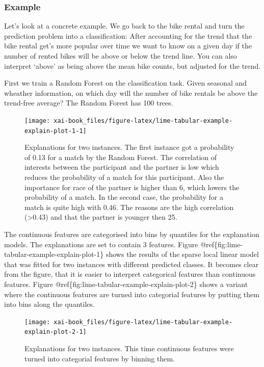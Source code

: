 \documentclass[12pt,]{krantz}
\theoremstyle{definition}
\theoremstyle{definition}
\theoremstyle{definition}
\theoremstyle{remark}
\begin{document}
\subsubsection{Example}\label{example-3}

Let's look at a concrete example. We go back to the bike rental and turn
the prediction problem into a classification: After accounting for the
trend that the bike rental get's more popular over time we want to know
on a given day if the number of rented bikes will be above or below the
trend line. You can also interpret `above' as being above the mean bike
counts, but adjusted for the trend.

First we train a Random Forest on the classification task. Given
seasonal and wheather information, on which day will the number of bike
rentals be above the trend-free average? The Random Forest has 100
trees.

\begin{figure}

{\centering \texttt{[image: xai-book\_files/figure-latex/lime-tabular-example-explain-plot-1-1]} 

}

\caption{Explanations for two instances. The first instance got a probability of 0.13 for a match by the Random Forest. The correlation of interests between the participant and the partner is low which reduces the probability of a match for this participant. Also the importance for race of the partner is higher than 6, which lowers the probability of a match.  In the second case, the probability for a match is quite high with 0.46. The reasons are the high correlation (>0.43) and that the partner is younger then 25.}\label{fig:lime-tabular-example-explain-plot-1}
\end{figure}

The continuous features are categorised into bins by quantiles for the
explanation models. The explanations are set to contain 3 features.
Figure @ref\{fig:lime-tabular-example-explain-plot-1\} shows the results
of the sparse local linear model that was fitted for two instances with
different predicted classes. It becomes clear from the figure, that it
is easier to interpret categorical features than continuous features.
Figure @ref\{fig:lime-tabular-example-explain-plot-2\} shows a variant
where the continuous features are turned into categorial features by
putting them into bins along the quantiles.

\begin{figure}

{\centering \texttt{[image: xai-book\_files/figure-latex/lime-tabular-example-explain-plot-2-1]} 

}

\caption{Explanations for two instances. This time continuous features were turned into categorial features by binning them.}\label{fig:lime-tabular-example-explain-plot-2}
\end{figure}
\end{document}
